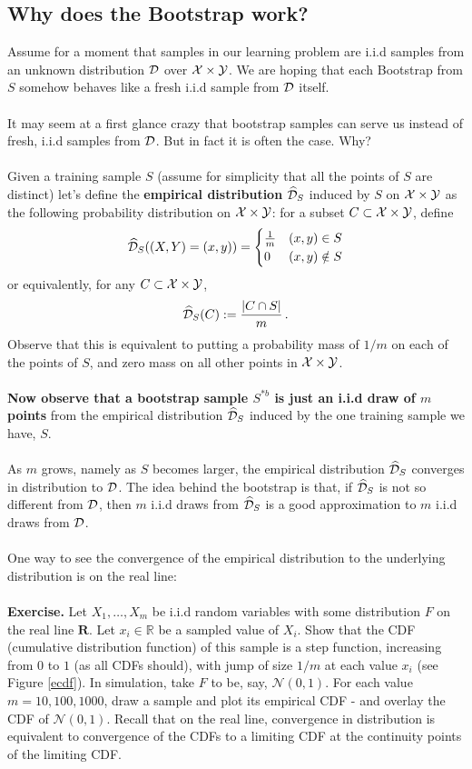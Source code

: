 \subsection{Why does the Bootstrap work?}

Assume for a moment that samples in our learning problem are i.i.d samples from an unknown
distribution $\mathcal{D}$ over $\mathcal{X}\times \mathcal{Y}$. We are hoping that each Bootstrap from $S$
somehow
behaves like a fresh i.i.d sample from $\mathcal{D}$ itself.
\\~\\
It may seem at a first glance crazy that bootstrap samples can serve us instead
of fresh, i.i.d samples from $\mathcal{D}$. But in fact it is often the case. Why?
\\~\\
Given a training sample $S$ (assume for simplicity that all the points of $S$
are distinct) let's define the {\bf empirical distribution}
$\widehat{\mathcal{D}}_S$ induced by $S$ on $\mathcal{X}\times \mathcal{Y}$ as the following probability distribution
on $\mathcal{X}\times \mathcal{Y}$: for a subset $C\subset \mathcal{X}\times \mathcal{Y}$, define
\[
  \widehat{\mathcal{D}}_S( (X,Y)=(x,y) ) = 
  \begin{cases}
    \frac{1}{m} & (x,y)\in S\\ 
    0 & (x,y) \notin S
  \end{cases}
\]
or equivalently, for any $C\subset \mathcal{X}\times \mathcal{Y}$,
\[
  \widehat{\mathcal{D}}_S(C):= \frac{| C \cap S |}{m}\,.
\]
Observe that this is equivalent to putting a probability mass of $1/m$ on each
of the points of $S$, and zero mass on all other points in $\mathcal{X}\times \mathcal{Y}$. 
\\~\\
{\bf Now observe that a bootstrap sample $S^{*b}$ is just an i.i.d draw of $m$
points}
from the empirical distribution $\widehat{\mathcal{D}}_S$ induced by the one training sample we
have, $S$.
\\~\\
As $m$ grows, namely as $S$ becomes larger, the empirical distribution $\widehat{\mathcal{D}}_S$
converges in distribution to $\mathcal{D}$. The idea behind the bootstrap is that, if
$\widehat{\mathcal{D}}_S$ is not so different from $\mathcal{D}$, then $m$ i.i.d draws from
$\widehat{\mathcal{D}}_S$ is a good
approximation to $m$ i.i.d draws from $\mathcal{D}$. 
\\~\\
One way to see the convergence of the empirical distribution to the underlying
distribution is on the real line:
\\~\\
{\bf Exercise.} Let $X_1,\ldots,X_m$ be i.i.d random variables with some
distribution $F$ on the real line $\mathbf{R}$. Let $x_i\in\mathbb{R}$ be a sampled value of
$X_i$. Show that the CDF (cumulative distribution function) of this sample is a
step function, increasing from $0$ to $1$ (as all CDFs should), with jump of
size $1/m$ at each value $x_i$ (see Figure \ref{ecdf}). 
In simulation, take $F$ to be, say,
$\mathcal{N}(0,1)$. For each value $m=10,100,1000$, draw a sample and plot its
empirical CDF - and overlay the CDF of $\mathcal{N}(0,1)$. Recall that on the
real line, convergence in distribution is equivalent to convergence of the CDFs
to a limiting CDF at the continuity points of the limiting CDF.


